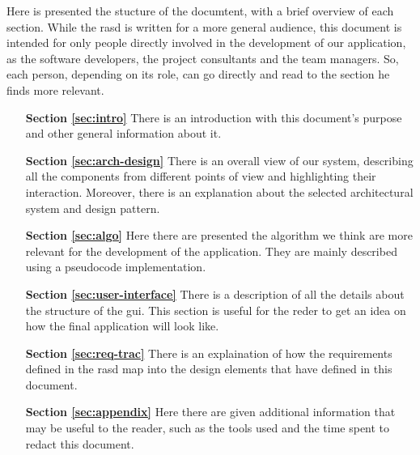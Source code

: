 Here is presented the stucture of the documtent,  with a brief overview of each section.
While the \acs{rasd} is written for a more general audience, this document is intended for only people directly involved in the development of our application, as the software developers, the project consultants and the team managers. 
So, each person, depending on its role, can go directly and read to the section he finds more relevant. 

\begin{itemize}

\item[\textbf{Section \ref{sec:intro}}]There is an introduction with this document's purpose and other general information about it.

\item[\textbf{Section \ref{sec:arch-design}}]There is an overall view of our system, describing all the components from different points of view and  highlighting their interaction. Moreover, there is an explanation about the selected architectural system and design pattern.

\item[\textbf{Section \ref{sec:algo}}]Here there are presented the algorithm we think are more relevant for the development of the application. They are mainly described using a pseudocode implementation.

\item[\textbf{Section \ref{sec:user-interface}}]There is a description of all the details about the structure of the \acl{gui}. This section is useful for the reder  to get an idea on how the final application will look like.

\item[\textbf{Section \ref{sec:req-trac}}]There is an explaination of how the requirements defined in the \acs{rasd} map into the design elements that have defined in this document.

\item[\textbf{Section \ref{sec:appendix}}]Here there are given additional information that may be useful to the reader, such as the tools used and the time spent to redact this document.
\end{itemize}

